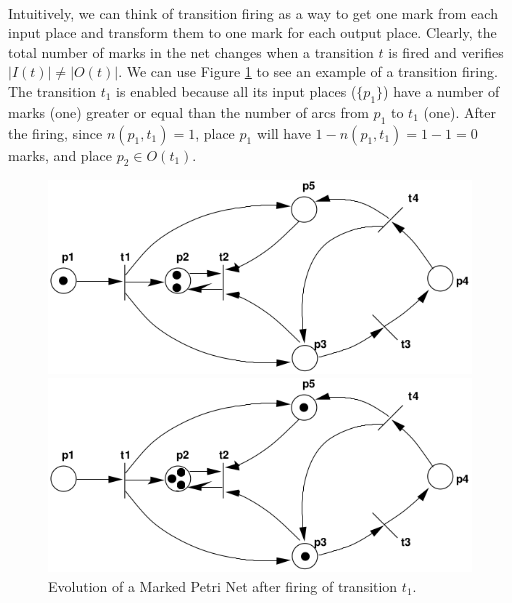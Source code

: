 \documentclass[12pt,english]{article} %
\begin{document}
\

Intuitively, we can think of transition firing as a way to get one mark from each input place and transform them to one mark for each output place.
Clearly, the total number of marks in the net changes when a transition $t$ is fired and verifies $|I(t)| \not= |O(t)|$.
We can use Figure \ref{fig:marked-petri-net-transition-firing-example} to see an example of a transition firing.
The transition $t_1$ is enabled because all its input places ($\{p_1\}$) have a number of marks (one) greater or equal than the number of arcs from $p_1$ to $t_1$ (one).
After the firing, since $n(p_1, t_1) = 1$, place $p_1$ will have $1-n(p_1, t_1) = 1-1 = 0$ marks, and place $p_2\in O(t_1)$.

\begin{figure}[h]
    \centering
    \begin{minipage}[t]{.5\textwidth}
      \centering
      \includegraphics[width=0.975\linewidth]{img/petri-net/mpn/marked-petri-net-example.png}
    \end{minipage}%
    \begin{minipage}[t]{.5\textwidth}
      \centering
      \includegraphics[width=0.975\linewidth]{img/petri-net/mpn/marked-petri-net-after-t1-firing-example.png}
    \end{minipage}
    \caption{Evolution of a Marked Petri Net after firing of transition $t_1$.}
    \label{fig:marked-petri-net-transition-firing-example}
\end{figure}
\end{document}
